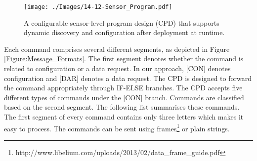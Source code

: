 \documentclass[graybox]{svmult}
\begin{document}
\begin{figure}[h]
 \centering
\texttt{[image: ./Images/14-12-Sensor\_Program.pdf]}
\caption{A configurable sensor-level program design (CPD) that supports dynamic discovery and configuration after deployment at runtime.}
 \label{Figure:Configurable_Sensor_Program}
\vspace{-18pt}
\end{figure}

Each command comprises several different segments, as depicted in Figure \ref{Figure:Message_Formats}. The first segment denotes whether the command is related to configuration or a data request. In our approach, [CON] denotes configuration and [DAR] denotes a data request. The CPD is designed to forward the command appropriately through IF-ELSE branches. The CPD accepts five different types of commands under the [CON] branch. Commands are classified based on the second segment. The following list summarises these commands. The first segment of every command contains only three letters which makes it easy to process. The commands can be sent using frames\footnote{http://www.libelium.com/uploads/2013/02/data\_frame\_guide.pdf}  or plain strings.
\end{document}
